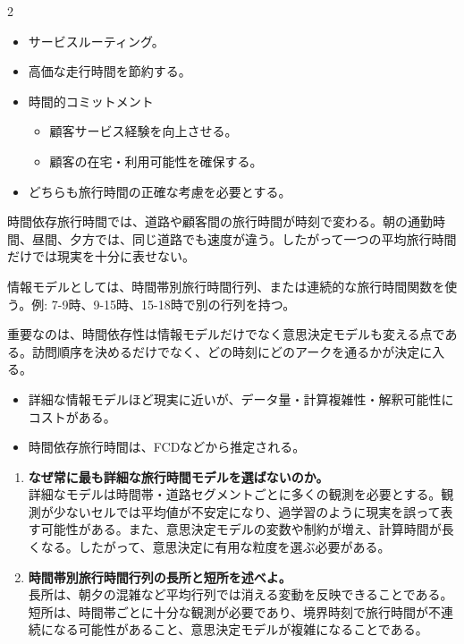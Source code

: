 \clearpage
{}
\begin{multicols}{2}\footnotesize\raggedcolumns
{}
\begin{itemize}
\item サービスルーティング。
\item 高価な走行時間を節約する。
\item 時間的コミットメント
\begin{itemize}
\item 顧客サービス経験を向上させる。
\item 顧客の在宅・利用可能性を確保する。
\end{itemize}
\item どちらも旅行時間の正確な考慮を必要とする。
\end{itemize}
時間依存旅行時間では、道路や顧客間の旅行時間が時刻で変わる。朝の通勤時間、昼間、夕方では、同じ道路でも速度が違う。したがって一つの平均旅行時間だけでは現実を十分に表せない。\par

情報モデルとしては、時間帯別旅行時間行列、または連続的な旅行時間関数を使う。例: 7-9時、9-15時、15-18時で別の行列を持つ。\par

重要なのは、時間依存性は情報モデルだけでなく意思決定モデルも変える点である。訪問順序を決めるだけでなく、どの時刻にどのアークを通るかが決定に入る。\par
{}
\begin{itemize}
\item 詳細な情報モデルほど現実に近いが、データ量・計算複雑性・解釈可能性にコストがある。
\item 時間依存旅行時間は、FCDなどから推定される。
\end{itemize}
\begin{enumerate}
\item \textbf{なぜ常に最も詳細な旅行時間モデルを選ばないのか。}\\詳細なモデルは時間帯・道路セグメントごとに多くの観測を必要とする。観測が少ないセルでは平均値が不安定になり、過学習のように現実を誤って表す可能性がある。また、意思決定モデルの変数や制約が増え、計算時間が長くなる。したがって、意思決定に有用な粒度を選ぶ必要がある。
\item \textbf{時間帯別旅行時間行列の長所と短所を述べよ。}\\長所は、朝夕の混雑など平均行列では消える変動を反映できることである。短所は、時間帯ごとに十分な観測が必要であり、境界時刻で旅行時間が不連続になる可能性があること、意思決定モデルが複雑になることである。
\end{enumerate}
\end{multicols}


